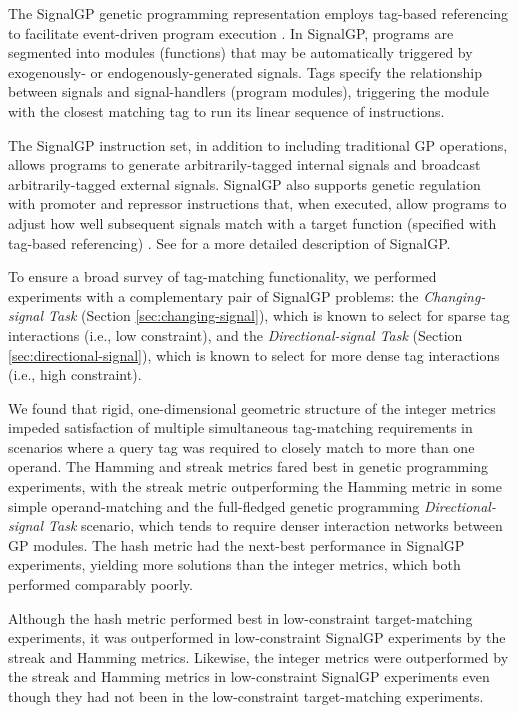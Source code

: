 The SignalGP genetic programming representation employs tag-based referencing to facilitate event-driven program execution \citep{lalejini2018evolving}.
In SignalGP, programs are segmented into modules (functions) that may be automatically triggered by exogenously- or endogenously-generated signals.
Tags specify the relationship between signals and signal-handlers (program modules), triggering the module with the closest matching tag to run its linear sequence of instructions.

The SignalGP instruction set, in addition to including traditional GP operations, allows programs to generate arbitrarily-tagged internal signals and broadcast arbitrarily-tagged external signals.
SignalGP also supports genetic regulation with promoter and repressor instructions that, when executed, allow programs to adjust how well subsequent signals match with a target function (specified with tag-based referencing) \citep{lalejini2021tag}.
See \cite{lalejini2018evolving} for a more detailed description of SignalGP.

To ensure a broad survey of tag-matching functionality, we performed experiments with a complementary pair of SignalGP problems: the \textit{Changing-signal Task} (Section \ref{sec:changing-signal}), which is known to select for sparse tag interactions (i.e., low constraint), and the \textit{Directional-signal Task} (Section \ref{sec:directional-signal}), which is known to select for more dense tag interactions (i.e., high constraint).

We found that rigid, one-dimensional geometric structure of the integer metrics impeded satisfaction of multiple simultaneous tag-matching requirements in scenarios where a query tag was required to closely match to more than one operand.
The Hamming and streak metrics fared best in genetic programming experiments, with the streak metric outperforming the Hamming metric in some simple operand-matching and the full-fledged genetic programming \textit{Directional-signal Task} scenario, which tends to require denser interaction networks between GP modules.
The hash metric had the next-best performance in SignalGP experiments, yielding more solutions than the integer metrics, which both performed comparably poorly.


Although the hash metric performed best in low-constraint target-matching experiments, it was outperformed in low-constraint SignalGP experiments by the streak and Hamming metrics.
Likewise, the integer metrics were outperformed by the streak and Hamming metrics in low-constraint SignalGP experiments even though they had not been in the low-constraint target-matching experiments.

